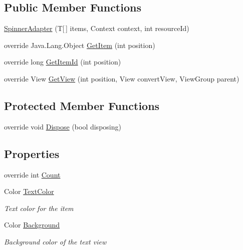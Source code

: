 \subsection*{Public Member Functions}
\begin{DoxyCompactItemize}
\item 
\hyperlink{class_field_service_1_1_android_1_1_spinner_adapter_3_01_t_01_4_abfffe0c1975287603d2d93ef5ded1d58}{Spinner\+Adapter} (T\mbox{[}$\,$\mbox{]} items, Context context, int resource\+Id)
\item 
override Java.\+Lang.\+Object \hyperlink{class_field_service_1_1_android_1_1_spinner_adapter_3_01_t_01_4_a142b213345453015f60f6424d0d017fb}{Get\+Item} (int position)
\item 
override long \hyperlink{class_field_service_1_1_android_1_1_spinner_adapter_3_01_t_01_4_a8f946e7099baec8a354a2fb0757a437e}{Get\+Item\+Id} (int position)
\item 
override View \hyperlink{class_field_service_1_1_android_1_1_spinner_adapter_3_01_t_01_4_ab4eb9fc7225950c765e219e982d9be2d}{Get\+View} (int position, View convert\+View, View\+Group parent)
\end{DoxyCompactItemize}
\subsection*{Protected Member Functions}
\begin{DoxyCompactItemize}
\item 
override void \hyperlink{class_field_service_1_1_android_1_1_spinner_adapter_3_01_t_01_4_a1255a3bc65251fc5242619c19c10702f}{Dispose} (bool disposing)
\end{DoxyCompactItemize}
\subsection*{Properties}
\begin{DoxyCompactItemize}
\item 
override int \hyperlink{class_field_service_1_1_android_1_1_spinner_adapter_3_01_t_01_4_a7c3b6905d5485342af38739eb3a6368c}{Count}
\item 
Color \hyperlink{class_field_service_1_1_android_1_1_spinner_adapter_3_01_t_01_4_adcdd717eea6385eab23eab4134e1ffc5}{Text\+Color}
\begin{DoxyCompactList}\small\item\em Text color for the item \end{DoxyCompactList}\item 
Color \hyperlink{class_field_service_1_1_android_1_1_spinner_adapter_3_01_t_01_4_a2d71d5572363e04858b91d4e7534c283}{Background}
\begin{DoxyCompactList}\small\item\em Background color of the text view \end{DoxyCompactList}\end{DoxyCompactItemize}


